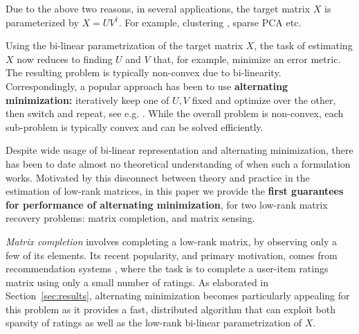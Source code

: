 \documentclass[11pt]{article}
\theoremstyle{plain}
\theoremstyle{definition}
\begin{document}
Due to the above two reasons, in several applications, the target matrix $X$ is parameterized by $X=UV^\dag$. For example, clustering \cite{KimPark08b}, sparse PCA \cite{ZouHT06} etc. 

Using the bi-linear parametrization of the target matrix $X$, the task of estimating $X$ now reduces to finding  $U$ and $V$ that, for example, minimize an error metric. The resulting problem is typically non-convex due to bi-linearity. Correspondingly, a popular approach has been to use {\bf alternating minimization:} iteratively keep one of $U,V$ fixed and optimize over the other, then switch and repeat, see e.g. \cite{KorenBV09}. While the overall problem is non-convex, each sub-problem is typically convex and can be solved efficiently.

Despite wide usage of bi-linear representation and alternating minimization, there has been to date almost no theoretical understanding of when such a formulation works. Motivated by this disconnect between theory and practice in the estimation of  low-rank matrices, in this paper we provide the {\bf first guarantees for performance of alternating minimization}, for two low-rank matrix recovery problems: matrix completion, and matrix sensing. 

{\em Matrix completion} involves completing a low-rank matrix, by observing only a few of its elements. Its recent popularity, and primary motivation, comes from recommendation systems \cite{KorenBV09}, where the task is to complete a user-item ratings matrix using only a small number of ratings. As elaborated in Section~\ref{sec:results}, alternating minimization becomes particularly appealing for this problem as it provides a fast, distributed algorithm that can exploit both sparsity of ratings as well as the low-rank bi-linear parametrization of $X$. %
\end{document}
